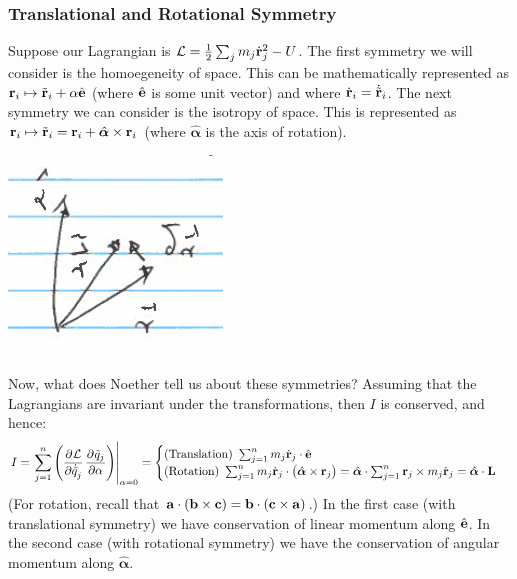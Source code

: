 \subsubsection{Translational and Rotational Symmetry}
Suppose our Lagrangian is $\mathcal{L}=\frac12 \sum_j m_j \dot{\mathbf{r}}_j^2-U$.
The first symmetry we will consider is the homoegeneity of space. This can be mathematically represented as $\mathbf{r}_i \mapsto \tilde{\mathbf{r}}_i + \alpha\hat{\mathbf{e}}$ (where $\hat{\mathbf{e}}$ is some unit vector) and where $\dot{\mathbf{r}}_i = \dot{\tilde{\mathbf{r}}}_i$. 
\newline The next symmetry we can consider is the isotropy of space. This is represented as $\mathbf{r}_i \mapsto \tilde{\mathbf{r}}_i = \mathbf{r}_i + \hat{\bm{\alpha}}\times \mathbf{r}_i$ (where $\hat{\bm{\alpha}}$ is the axis of rotation).
\begin{center}
    \includegraphics[scale=0.4]{Lecture-7/L7-img1.png}
\end{center}
Now, what does Noether tell us about these symmetries? Assuming that the Lagrangians are invariant under the transformations, then $I$ is conserved, and hence:
\[I = \left.\sum_{j=1}^n\left(\dpd{\LL}{\dot{\tilde{q}}_j}\dpd{\tilde{q}_j}{\alpha}\right)\right|_{\alpha=0} = \begin{cases}
\text{(Translation) } \sum_{j=1}^n m_j\dot{\v{r}}_j \cdot \ehat
\\ \text{(Rotation) } \sum_{j=1}^n m_j\dot{\v{r}}_j \cdot \left(\hat{\bm{\alpha}} \times \v{r}_j\right) = \hat{\bm{\alpha}}\cdot\sum_{j=1}^n \v{r}_j \times m_j \dot{\v{r}}_j
= \hat{\bm{\alpha}}\cdot\v{L}\end{cases}\]
(For rotation, recall that $\mathbf{a}\cdot(\mathbf{b}\times\mathbf{c})=\mathbf{b}\cdot(\mathbf{c}\times\mathbf{a})$.)
In the first case (with translational symmetry) we have conservation of linear momentum along $\hat{\mathbf{e}}$. In the second case (with rotational symmetry) we have the conservation of angular momentum along $\hat{\bm{\alpha}}$.

